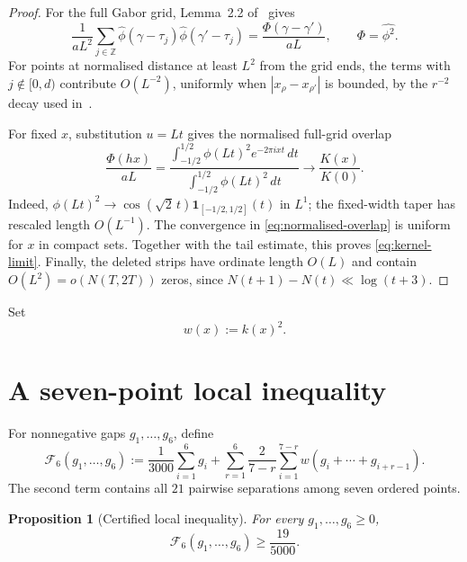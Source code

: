 \documentclass[11pt]{article}
\newtheorem{proposition}[theorem]{Proposition}
\begin{document}
\begin{proof}
For the full Gabor grid, Lemma~2.2 of~\cite{Claude26} gives
\[
 \frac1{aL^2}\sum_{j\in\mathbb Z}
 \widehat\phi(\gamma-\tau_j)\widehat\phi(\gamma'-\tau_j)
 =\frac{\Phi(\gamma-\gamma')}{aL},
 \qquad \Phi=\widehat{\phi^2}.
\]
For points at normalised distance at least $L^2$ from the grid ends, the
terms with $j\notin[0,d)$ contribute $O(L^{-2})$, uniformly when
$|x_\rho-x_{\rho'}|$ is bounded, by the $r^{-2}$ decay used
in~\cite[\S5.3]{Claude26}.

For fixed $x$, substitution $u=Lt$ gives the normalised full-grid overlap
\begin{equation}\label{eq:normalised-overlap}
 \frac{\Phi(hx)}{aL}
 =
 \frac{\displaystyle\int_{-1/2}^{1/2}
       \phi(Lt)^2 e^{-2\pi ixt}\,dt}
      {\displaystyle\int_{-1/2}^{1/2}\phi(Lt)^2\,dt}
 \longrightarrow \frac{K(x)}{K(0)}.
\end{equation}
Indeed,
$\phi(Lt)^2\to\cos(\sqrt2\,t)\mathbf1_{[-1/2,1/2]}(t)$ in $L^1$;
the fixed-width taper has rescaled length $O(L^{-1})$.  The convergence in
\eqref{eq:normalised-overlap} is uniform for $x$ in compact sets.  Together
with the tail estimate, this proves \eqref{eq:kernel-limit}.  Finally, the
deleted strips have ordinate length $O(L)$ and contain $O(L^2)=o(N(T,2T))$
zeros, since $N(t+1)-N(t)\ll\log(t+3)$.
\end{proof}

Set
\[
 w(x):=k(x)^2.
\]

\section{A seven-point local inequality}

For nonnegative gaps $g_1,\ldots,g_6$, define
\begin{equation}\label{eq:F6}
 \mathcal F_6(g_1,\ldots,g_6)
 :=\frac1{3000}\sum_{i=1}^6g_i
 +\sum_{r=1}^6\frac{2}{7-r}
   \sum_{i=1}^{7-r}w(g_i+\cdots+g_{i+r-1}).
\end{equation}
The second term contains all $21$ pairwise separations among seven ordered
points.

\begin{proposition}[Certified local inequality]\label{prop:F6}
For every $g_1,\ldots,g_6\ge0$,
\begin{equation}\label{eq:F6bound}
 \mathcal F_6(g_1,\ldots,g_6)\ge\frac{19}{5000}.
\end{equation}
\end{proposition}
\end{document}
